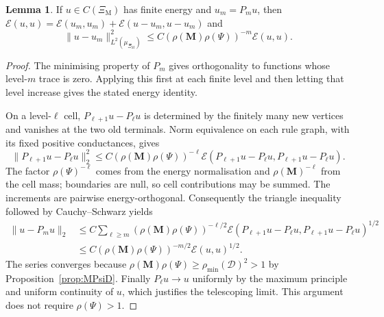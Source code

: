 \documentclass{article}
\DeclareRobustCommand{\revision}[1]{{\color{red}#1}}
\theoremstyle{plain}
\theoremstyle{definition}
\newtheorem{lemma}[theorem]{Lemma}
\begin{document}
\begin{lemma}\label{lem:sec31_projection_tail_continuous}
\revision{If $u\in C(\Xi_{\mathrm M})$ has finite energy and $u_m=P_m u$, then} $\mathcal E(u,u)=\mathcal E(u_m,u_m)+\mathcal E(u-u_m,u-u_m)$ and
\[
\|u-u_m\|_{L^2(\mu_{\Xi_{\mathrm M}})}^2
\le
C(\rho(\mathbf M)\rho(\Psi))^{-m}\mathcal E(u,u).
\]
\end{lemma}

\begingroup\color{red}
\begin{proof}
The minimising property of $P_m$ gives orthogonality to functions whose
level-$m$ trace is zero. Applying this first at each finite level and then
letting that level increase gives the stated energy identity.

On a level-$\ell$ cell, $P_{\ell+1}u-P_\ell u$ is determined by the finitely
many new vertices and vanishes at the two old terminals. Norm equivalence on
each rule graph, with its fixed positive conductances, gives
\[
\|P_{\ell+1}u-P_\ell u\|_2^2
\le C(\rho(\mathbf M)\rho(\Psi))^{-\ell}
\mathcal E(P_{\ell+1}u-P_\ell u,P_{\ell+1}u-P_\ell u).
\]
The factor $\rho(\Psi)^{-\ell}$ comes from the energy normalisation and
$\rho(\mathbf M)^{-\ell}$ from the cell mass; boundaries are null, so cell
contributions may be summed. The increments are pairwise energy-orthogonal.
Consequently the triangle inequality followed by Cauchy--Schwarz yields
\begin{align*}
\|u-P_m u\|_2
&\le C\sum_{\ell\ge m}(\rho(\mathbf M)\rho(\Psi))^{-\ell/2}
\mathcal E(P_{\ell+1}u-P_\ell u,P_{\ell+1}u-P_\ell u)^{1/2}\\
&\le C(\rho(\mathbf M)\rho(\Psi))^{-m/2}\mathcal E(u,u)^{1/2}.
\end{align*}
The series converges because
$\rho(\mathbf M)\rho(\Psi)\ge\rho_{\min}(\mathcal D)^2>1$
by Proposition~\ref{prop:MPsiD}. Finally $P_\ell u\to u$ uniformly by the
maximum principle and uniform continuity of $u$, which justifies the
telescoping limit. This argument does not require $\rho(\Psi)>1$.
\end{proof}
\endgroup{}
\end{document}
